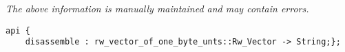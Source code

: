 \label{api:Disassembler\_Intel32}

{\tiny \it The above information is manually maintained and may contain errors.}
\begin{verbatim}
api {
    disassemble : rw_vector_of_one_byte_unts::Rw_Vector -> String;};
\end{verbatim}
